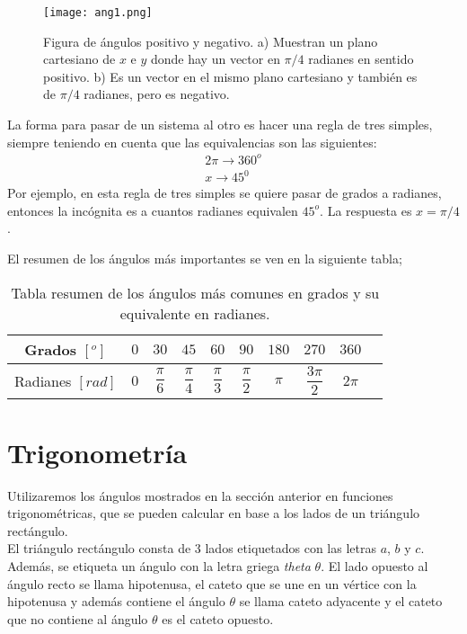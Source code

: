  \begin{center}
\begin{figure}[h!]
\centering
\texttt{[image: ang1.png]}
\caption[Figura de radianes positivo y negativo]{Figura de ángulos positivo y negativo. a) Muestran un plano cartesiano de $x$ e $y$ donde hay un vector en $\pi/4$ radianes en sentido positivo. b) Es un vector en el mismo plano cartesiano y también es de $\pi/4$ radianes, pero es negativo.} \label{grados0}
\end{figure}
\end{center}

La forma para pasar de un sistema al otro es hacer una regla de tres simples, siempre teniendo en cuenta que las equivalencias son las siguientes:
\begin{eqnarray*}
2\pi\rightarrow 360^{o}\\
x\rightarrow 45^{0}
\end{eqnarray*}
Por ejemplo, en esta regla de tres simples se quiere pasar de grados a radianes, entonces la incógnita es a cuantos radianes equivalen $45^{o}$. La respuesta es $x=\pi/4$.

El resumen de los ángulos más importantes se ven en la siguiente tabla;


\begin{table}[h!]
\begin{center}
 \begin{tabular}{|c|c|c|c|c|c|c|c|c|c|}
 \hline
 Grados $[^{o}]$ &$0$&$30$&$45$&$60$&$90$&$180$&$270$&$360$ \\
 \hline
 Radianes $[rad]$ &$0$&$\dfrac{\pi}{6}$&$\dfrac{\pi}{4}$&$\dfrac{\pi}{3}$&$\dfrac{\pi}{2}$&$\pi$&$\dfrac{3\pi}{2}$&$2\pi$ \\
 \hline
 \end{tabular}
 \caption{Tabla resumen de los ángulos más comunes en grados y su equivalente en radianes.}
 \end{center}
\end{table}

\section{Trigonometría}

Utilizaremos los ángulos mostrados en la sección anterior en funciones trigonométricas, que se pueden calcular en base a los lados de un triángulo rectángulo.\\
El triángulo rectángulo consta de 3 lados etiquetados con las letras $a$, $b$ y $c$. Además, se etiqueta un ángulo con la letra griega \textit{theta} $\theta$. El lado opuesto al ángulo recto se llama hipotenusa, el cateto que se une en un vértice con la hipotenusa y además contiene el ángulo $\theta$ se llama cateto adyacente y el cateto que no contiene al ángulo $\theta$ es el cateto opuesto.

